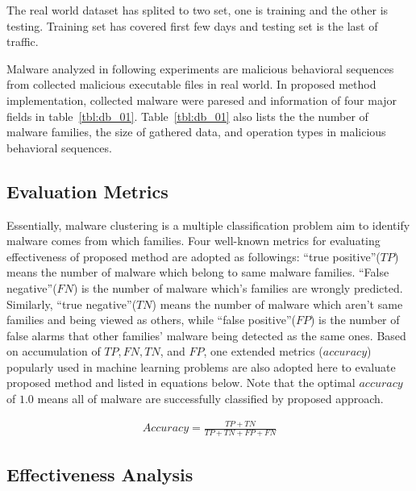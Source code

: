 The real world dataset has splited to two set, one is training and the other is testing. Training set has covered first few days and testing set is the last of traffic.

Malware analyzed in following experiments are malicious behavioral sequences from collected malicious executable files in real world.  In proposed method implementation, collected malware were paresed and information of four major fields in table~\ref{tbl:db_01}. Table~\ref{tbl:db_01} also lists the the number of malware families, the size of gathered data, and operation types in malicious behavioral sequences. 


\subsection{Evaluation Metrics}

{\color{red}{Tony, pliz replace malware to fingerprint!!!}}

Essentially, malware clustering is a multiple classification problem aim to identify malware comes from which families. Four well-known metrics for evaluating effectiveness of proposed method are adopted as followings: ``true positive''($TP$) means the number of malware which belong to same malware families. ``False negative''($FN$) is the number of malware which's families are wrongly predicted. Similarly, ``true negative''($TN$) means the number of malware which aren't same families and being viewed as others, while ``false positive''($FP$) is the number of false alarms that other families' malware being detected as the same ones. Based on accumulation of $TP, FN, TN$, and $FP$, one extended metrics ($accuracy$) popularly used in machine learning problems are also adopted here to evaluate proposed method and listed in equations below. Note that the optimal $accuracy$ of $1.0$ means all of malware are successfully classified by proposed approach. 

\begin{eqnarray}
\label{eq:accuracy}
Accuracy = \frac{TP+TN}{TP+TN+FP+FN}
\end{eqnarray}

\subsection{Effectiveness Analysis}

{\color{red}{Tony, pliz show your exp graph and table here!!!}}\\

